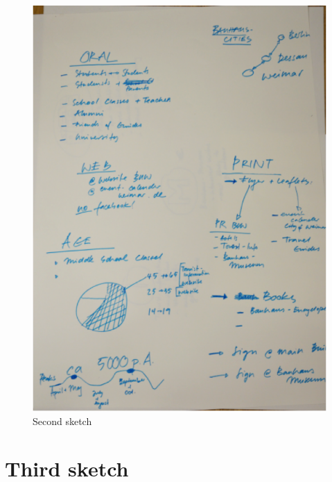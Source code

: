 \begin{appendices}
\begin{figure}[H]
    \centering
    \includegraphics[width=\textwidth,height=0.8\textheight]{Appendices/4/sk2}%
    \caption{Second sketch}%
    \label{app:Sk2}%
\end{figure}


\section{Third sketch}


\end{appendices}
